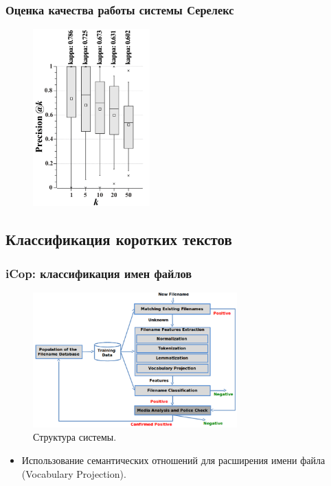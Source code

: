 \begin{frame}
\frametitle{Оценка качества работы системы Серелекс}

\begin{figure}
\centering
\includegraphics[width=0.4\textwidth]{figures/eval2-bc}     
\end{figure}

\end{frame}




\subsection{Классификация коротких текстов}

\begin{frame}[fragile]
\frametitle{iCop: классификация имен файлов}

\begin{figure}
\center
\includegraphics[width=0.7\textwidth]{./icop}
\caption{Структура системы.}
\end{figure}

\begin{itemize}
  \item Использование семантических отношений для расширения имени файла
  (Vocabulary Projection).
\end{itemize}


\end{frame}


